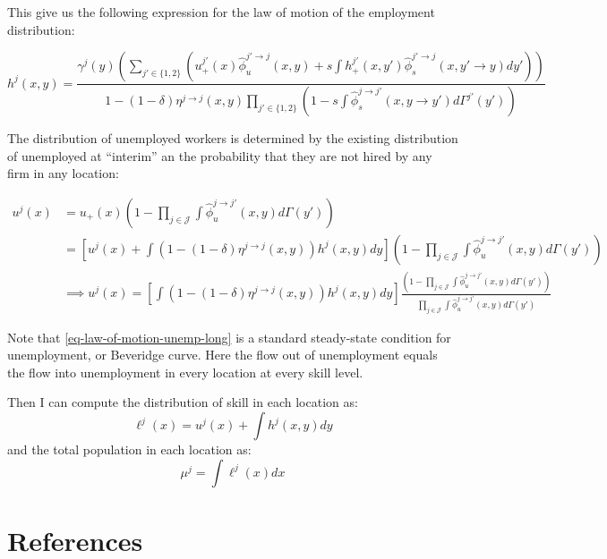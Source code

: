 \documentclass[
  letterpaper,
  DIV=11,
  numbers=noendperiod]{scrartcl}
\begin{document}
This give us the following expression for the law of motion of the
employment distribution:

\begin{equation}
\label{eq-law-of-motion-emp-long}
h^{j}(x,y) = \frac{\gamma^{j}(y) \left(\sum_{j'\in\{1,2\}} \left( u_{+}^{j'}(x)\hat{\phi}_{u}^{j'\to j}(x,y) + s\int{ h_{+}^{j'}(x,y') \hat{\phi}_{s}^{j' \to j}(x,y'\to y) dy'} \right)\right)}{
  1 - (1-\delta)\eta^{j \to j}(x,y) \prod_{j' \in \{1,2\}}\left(1 - s \int \hat{\phi}_{s}^{j\to j'}(x,y\to y')d\Gamma^{j'}(y')\right) 
}
\end{equation}

The distribution of unemployed workers is determined by the existing
distribution of unemployed at ``interim'' an the probability that they
are not hired by any firm in any location:

\begin{align}
u^j(x) &= u_{+}(x) \left(1 - \prod_{j\in \mathcal{J}}  \int \hat{\phi}_{u}^{j\to j'}(x,y) d\Gamma(y')\right) \nonumber\\
&= \left[u^j(x) + \int\left(1 - (1 - \delta)\eta^{j\to j}(x,y) \right)h^j(x,y)dy  \right]\left(1 - \prod_{j\in \mathcal{J}}  \int \hat{\phi}_{u}^{j\to j'}(x,y) d\Gamma(y')\right) \nonumber\\
&\implies u^j(x) = \left[\int\left(1 - (1 - \delta)\eta^{j\to j}(x,y) \right)h^j(x,y)dy  \right] \frac{\left(1 - \prod_{j\in \mathcal{J}}  \int \hat{\phi}_{u}^{j\to j'}(x,y) d\Gamma(y')\right) }{\prod_{j\in \mathcal{J}}  \int \hat{\phi}_{u}^{j\to j'}(x,y) d\Gamma(y')} \label{eq-law-of-motion-unemp-long}
\end{align}

Note that \eqref{eq-law-of-motion-unemp-long} is a standard steady-state
condition for unemployment, or Beveridge curve. Here the flow out of
unemployment equals the flow into unemployment in every location at
every skill level.

Then I can compute the distribution of skill in each location as:
\[\ell^j(x) = u^j(x) + \int h^j(x,y)dy\] and the total population in
each location as: \[\mu^j = \int \ell^j(x)dx\]

\hypertarget{bibliography}{%
\section*{References}\label{bibliography}}
\end{document}

